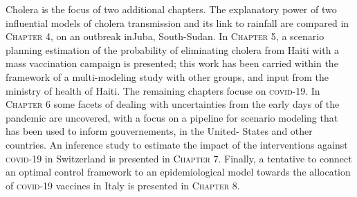 Cholera is the focus of two additional chapters. The explanatory power of two influential models of cholera transmission and its link to rainfall are compared in \textsc{Chapter 4}, on an outbreak inJuba, South-Sudan. In \textsc{Chapter 5}, a scenario planning estimation of the probability of eliminating cholera from Haiti with a mass vaccination campaign is presented; this work has been carried within the framework of a multi-modeling study with other groups, and input from the ministry of health of Haiti.
The remaining chapters focuse on \textsc{covid}-19. In \textsc{Chapter 6} some facets of dealing with uncertainties from the early days of the pandemic are uncovered, with a focus on a pipeline for scenario modeling that has been used to inform gouvernements, in the United- States and other countries. 
An inference study to estimate the impact of the interventions against \textsc{covid}-19 in Switzerland is presented in \textsc{Chapter 7}.
Finally, a tentative to connect an optimal control framework to an epidemiological model towards the allocation of \textsc{covid}-19 vaccines in Italy is presented in \textsc{Chapter 8}.

